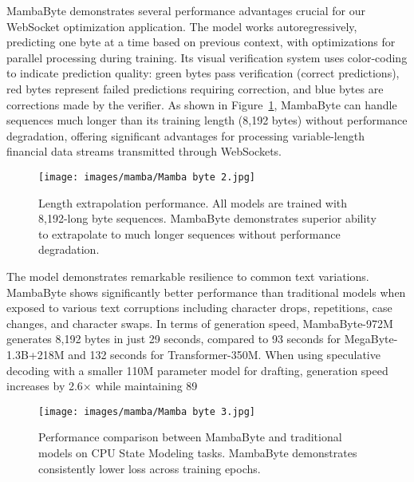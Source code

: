 \documentclass[a4paper, 11pt, twoside, openright]{report}
\begin{document}
MambaByte demonstrates several performance advantages crucial for our WebSocket optimization application. The model works autoregressively, predicting one byte at a time based on previous context, with optimizations for parallel processing during training. Its visual verification system uses color-coding to indicate prediction quality: green bytes pass verification (correct predictions), red bytes represent failed predictions requiring correction, and blue bytes are corrections made by the verifier. As shown in Figure~\ref{fig:length_extrapolation}, MambaByte can handle sequences much longer than its training length (8,192 bytes) without performance degradation, offering significant advantages for processing variable-length financial data streams transmitted through WebSockets.

\begin{figure}[h] \centering \texttt{[image: images/mamba/Mamba byte 2.jpg]} \caption{Length extrapolation performance. All models are trained with 8,192-long byte sequences. MambaByte demonstrates superior ability to extrapolate to much longer sequences without performance degradation.} \label{fig:length_extrapolation} \end{figure}

The model demonstrates remarkable resilience to common text variations. MambaByte shows significantly better performance than traditional models when exposed to various text corruptions including character drops, repetitions, case changes, and character swaps. In terms of generation speed, MambaByte-972M generates 8,192 bytes in just 29 seconds, compared to 93 seconds for MegaByte-1.3B+218M and 132 seconds for Transformer-350M. When using speculative decoding with a smaller 110M parameter model for drafting, generation speed increases by 2.6× while maintaining 89%

\begin{figure}[h] \centering \texttt{[image: images/mamba/Mamba byte 3.jpg]} \caption{Performance comparison between MambaByte and traditional models on CPU State Modeling tasks. MambaByte demonstrates consistently lower loss across training epochs.} \label{fig:performance_comparison} \end{figure}
\end{document}
